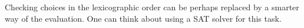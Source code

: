 \documentclass{article}
\begin{document}
	Checking choices in the lexicographic order can be perhaps replaced by a smarter way of the evaluation. One can think about using a SAT solver for this task.
%	
%	
%			
%				
%			
	
%	
	
\end{document}
